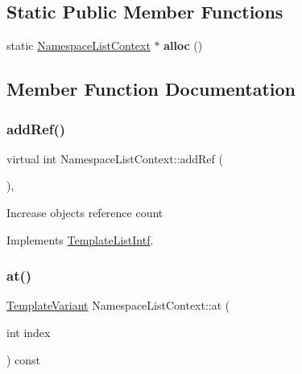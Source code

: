 \subsection*{Static Public Member Functions}
\begin{DoxyCompactItemize}
\item 
\mbox{\label{class_namespace_list_context_ae070ce49758dfeaa3d5e229bfd5e3741}} 
static \mbox{\hyperlink{class_namespace_list_context}{Namespace\+List\+Context}} $\ast$ {\bfseries alloc} ()
\end{DoxyCompactItemize}


\subsection{Member Function Documentation}
\mbox{\label{class_namespace_list_context_a59c6b6d62a82299a64b36709f6db156f}} 
\subsubsection{\texorpdfstring{addRef()}{addRef()}}
{\footnotesize\ttfamily virtual int Namespace\+List\+Context\+::add\+Ref (\begin{DoxyParamCaption}{ }\end{DoxyParamCaption})\hspace{0.3cm}{\ttfamily [inline]}, {\ttfamily [virtual]}}

Increase object\textquotesingle{}s reference count 

Implements \mbox{\hyperlink{class_template_list_intf_a4b4973e2e15396d10bc4e3085462ca2b}{Template\+List\+Intf}}.

\mbox{\label{class_namespace_list_context_aad786580251baade29f06a76612201cd}} 
\subsubsection{\texorpdfstring{at()}{at()}}
{\footnotesize\ttfamily \mbox{\hyperlink{class_template_variant}{Template\+Variant}} Namespace\+List\+Context\+::at (\begin{DoxyParamCaption}\item[{int}]{index }\end{DoxyParamCaption}) const\hspace{0.3cm}{\ttfamily [virtual]}}

